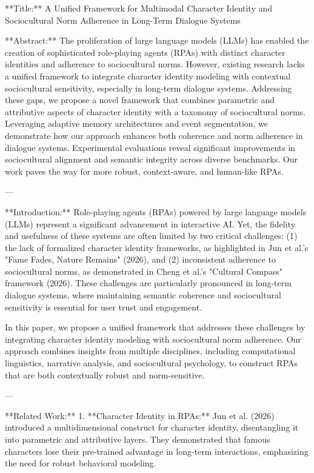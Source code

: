 **Title:**  
A Unified Framework for Multimodal Character Identity and Sociocultural Norm Adherence in Long-Term Dialogue Systems  

**Abstract:**  
The proliferation of large language models (LLMs) has enabled the creation of sophisticated role-playing agents (RPAs) with distinct character identities and adherence to sociocultural norms. However, existing research lacks a unified framework to integrate character identity modeling with contextual sociocultural sensitivity, especially in long-term dialogue systems. Addressing these gaps, we propose a novel framework that combines parametric and attributive aspects of character identity with a taxonomy of sociocultural norms. Leveraging adaptive memory architectures and event segmentation, we demonstrate how our approach enhances both coherence and norm adherence in dialogue systems. Experimental evaluations reveal significant improvements in sociocultural alignment and semantic integrity across diverse benchmarks. Our work paves the way for more robust, context-aware, and human-like RPAs.  

---

**Introduction:**  
Role-playing agents (RPAs) powered by large language models (LLMs) represent a significant advancement in interactive AI. Yet, the fidelity and usefulness of these systems are often limited by two critical challenges: (1) the lack of formalized character identity frameworks, as highlighted in Jun et al.'s "Fame Fades, Nature Remains" (2026), and (2) inconsistent adherence to sociocultural norms, as demonstrated in Cheng et al.'s "Cultural Compass" framework (2026). These challenges are particularly pronounced in long-term dialogue systems, where maintaining semantic coherence and sociocultural sensitivity is essential for user trust and engagement.  

In this paper, we propose a unified framework that addresses these challenges by integrating character identity modeling with sociocultural norm adherence. Our approach combines insights from multiple disciplines, including computational linguistics, narrative analysis, and sociocultural psychology, to construct RPAs that are both contextually robust and norm-sensitive.  

---

**Related Work:**  
1. **Character Identity in RPAs:**  
Jun et al. (2026) introduced a multidimensional construct for character identity, disentangling it into parametric and attributive layers. They demonstrated that famous characters lose their pre-trained advantage in long-term interactions, emphasizing the need for robust behavioral modeling.  

